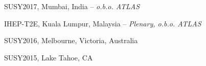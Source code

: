 \documentclass[11pt,letterpaper]{article}
\begin{document}
\begin{itemizetighter}
  \item SUSY2017, Mumbai, India -- \emph{o.b.o. ATLAS}  %

  \item IHEP-T2E, Kuala Lumpur, Malaysia -- \emph{Plenary, o.b.o. ATLAS}  %

  \item SUSY2016, Melbourne, Victoria, Australia %


  \item SUSY2015, Lake Tahoe, CA %


\end{itemizetighter}
\end{document}
